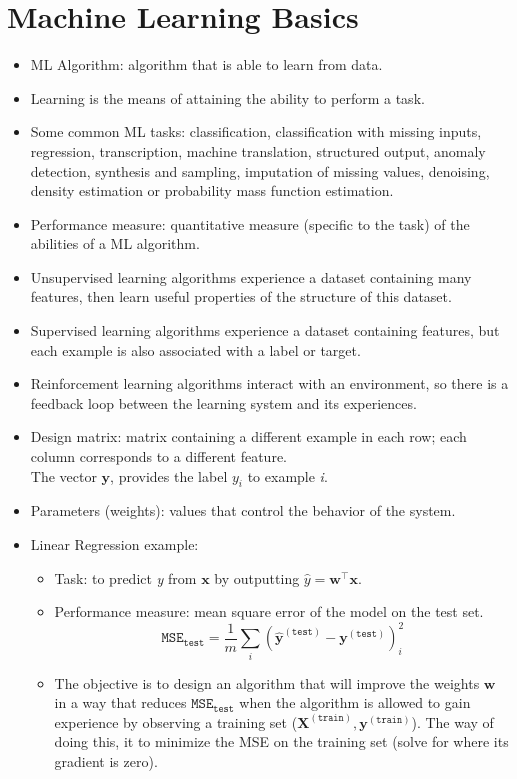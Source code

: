 \documentclass{article}
\begin{document}
\section{Machine Learning Basics}
\begin{itemize}
\item ML Algorithm: algorithm that is able to learn from data.
\item Learning is the means of attaining the ability to perform a task.
\item Some common ML tasks: classification, classification with missing inputs, regression, transcription, machine translation, structured output, anomaly detection, synthesis and sampling, imputation of missing values, denoising, density estimation or probability mass function estimation.
\item Performance measure: quantitative measure (specific to the task) of the abilities of a ML algorithm.
\item Unsupervised learning algorithms experience a dataset containing many features, then learn useful properties of the structure of this dataset.
\item Supervised learning algorithms experience a dataset containing features, but each example is also associated with a label or target.
\item Reinforcement learning algorithms interact with an environment,  so there is a feedback loop between the learning system and its experiences.
\item Design matrix: matrix containing a different example in each row; each column corresponds to a different feature.\\The vector \(\boldsymbol{y}\), provides the label \(y_i\) to example \textit{i}.
\item Parameters (weights): values that control the behavior of the system.
\item Linear Regression example: 
\begin{itemize}
\item Task: to predict \textit{y} from \(\boldsymbol{x}\) by outputting \(\hat{y} = \boldsymbol{w}^{\top} \boldsymbol{x}\).
\item Performance measure: mean square error of the model on the test set.
\[
	\mathtt{MSE}_{\mathtt{test}} = \frac{1}{m} \sum_i (\hat{\boldsymbol{y}}^{(\mathtt{test})} - \boldsymbol{y}^{(\mathtt{test})})^{2}_i
\]
\item The objective is to design an algorithm that will improve the weights \(\boldsymbol{w}\) in a way that reduces \(\mathtt{MSE}_{\mathtt{test}}\) when the algorithm is allowed to gain experience by observing a training set (\(\boldsymbol{X}^{(\mathtt{train})}, \boldsymbol{y}^{(\mathtt{train})}\)). The way of doing this, it to minimize the MSE on the training set (solve for where its gradient is zero).

\end{itemize}
\end{itemize}
\end{document}
